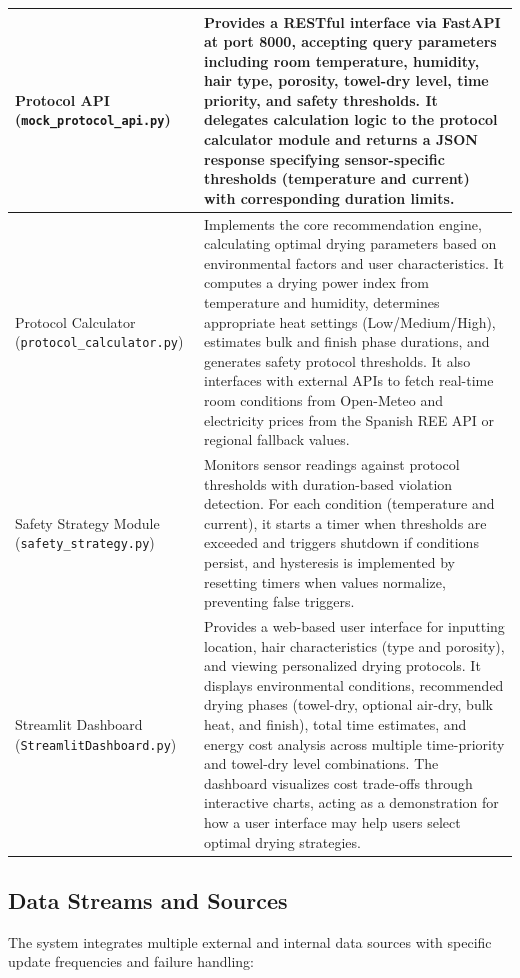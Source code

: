 \documentclass[11pt,a4paper]{article}
\begin{document}
\begin{longtable}{|p{}|p{}|}
\hline
Protocol API (\texttt{mock\_protocol\_api.py}) & Provides a RESTful interface via FastAPI at port 8000, accepting query parameters including room temperature, humidity, hair type, porosity, towel-dry level, time priority, and safety thresholds. It delegates calculation logic to the protocol calculator module and returns a JSON response specifying sensor-specific thresholds (temperature and current) with corresponding duration limits. \\
\hline
Protocol Calculator (\texttt{protocol\_calculator.py}) & Implements the core recommendation engine, calculating optimal drying parameters based on environmental factors and user characteristics. It computes a drying power index from temperature and humidity, determines appropriate heat settings (Low/Medium/High), estimates bulk and finish phase durations, and generates safety protocol thresholds. It also interfaces with external APIs to fetch real-time room conditions from Open-Meteo and electricity prices from the Spanish REE API or regional fallback values. \\
\hline
Safety Strategy Module (\texttt{safety\_strategy.py}) & Monitors sensor readings against protocol thresholds with duration-based violation detection. For each condition (temperature and current), it starts a timer when thresholds are exceeded and triggers shutdown if conditions persist, and hysteresis is implemented by resetting timers when values normalize, preventing false triggers. \\
\hline
Streamlit Dashboard (\texttt{StreamlitDashboard.py}) & Provides a web-based user interface for inputting location, hair characteristics (type and porosity), and viewing personalized drying protocols. It displays environmental conditions, recommended drying phases (towel-dry, optional air-dry, bulk heat, and finish), total time estimates, and energy cost analysis across multiple time-priority and towel-dry level combinations. The dashboard visualizes cost trade-offs through interactive charts, acting as a demonstration for how a user interface may help users select optimal drying strategies. \\
\hline
\end{longtable}

\subsection{Data Streams and Sources}

The system integrates multiple external and internal data sources with specific update frequencies and failure handling:
\end{document}
